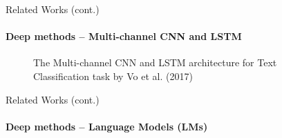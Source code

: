\begin{frame}{Related Works (cont.)}
\framesubtitle{Deep methods -- Multi-channel CNN and LSTM}
\begin{figure}
\centering
{}
\caption{The Multi-channel CNN and LSTM architecture for Text Classification task by Vo et al. (2017)\cite{Vo2017}}
\end{figure}
\end{frame}

\begin{frame}{Related Works (cont.)}
\framesubtitle{Deep methods -- Language Models (LMs)}

\end{frame}


